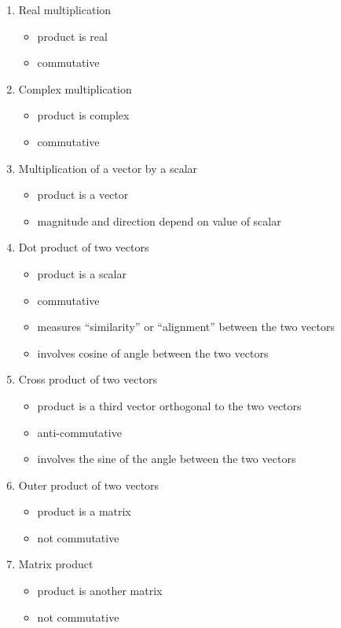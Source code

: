 \documentclass[
  a4paper,
]{article}
\providecommand{\tightlist}{%
  \setlength{\itemsep}{0pt}\setlength{\parskip}{0pt}}
\begin{document}
\begin{enumerate}
\tightlist
\item
  Real multiplication

  \begin{itemize}
  \tightlist
  \item
    product is real
  \item
    commutative
  \end{itemize}
\item
  Complex multiplication

  \begin{itemize}
  \tightlist
  \item
    product is complex
  \item
    commutative
  \end{itemize}
\item
  Multiplication of a vector by a scalar

  \begin{itemize}
  \tightlist
  \item
    product is a vector
  \item
    magnitude and direction depend on value of scalar
  \end{itemize}
\item
  Dot product of two vectors

  \begin{itemize}
  \tightlist
  \item
    product is a scalar
  \item
    commutative
  \item
    measures ``similarity'' or ``alignment'' between the two vectors
  \item
    involves cosine of angle between the two vectors
  \end{itemize}
\item
  Cross product of two vectors

  \begin{itemize}
  \tightlist
  \item
    product is a third vector orthogonal to the two vectors
  \item
    anti-commutative
  \item
    involves the sine of the angle between the two vectors
  \end{itemize}
\item
  Outer product of two vectors

  \begin{itemize}
  \tightlist
  \item
    product is a matrix
  \item
    not commutative
  \end{itemize}
\item
  Matrix product

  \begin{itemize}
  \tightlist
  \item
    product is another matrix
  \item
    not commutative
  \end{itemize}
\end{enumerate}
\end{document}
